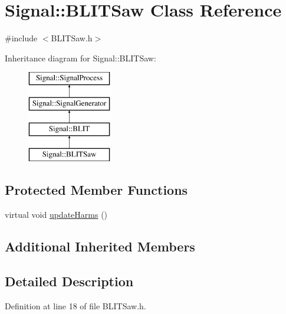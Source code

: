 \hypertarget{class_signal_1_1_b_l_i_t_saw}{\section{Signal\+:\+:B\+L\+I\+T\+Saw Class Reference}
\label{class_signal_1_1_b_l_i_t_saw}
}


{\ttfamily \#include $<$B\+L\+I\+T\+Saw.\+h$>$}

Inheritance diagram for Signal\+:\+:B\+L\+I\+T\+Saw\+:\begin{figure}[H]
\begin{center}
\leavevmode
\includegraphics[height=4.000000cm]{class_signal_1_1_b_l_i_t_saw}
\end{center}
\end{figure}
\subsection*{Protected Member Functions}
\begin{DoxyCompactItemize}
\item 
virtual void \hyperlink{class_signal_1_1_b_l_i_t_saw_ac2dd5e8cbd1797fe62aa0947e1fd1b9f}{update\+Harms} ()
\end{DoxyCompactItemize}
\subsection*{Additional Inherited Members}


\subsection{Detailed Description}


Definition at line 18 of file B\+L\+I\+T\+Saw.\+h.



